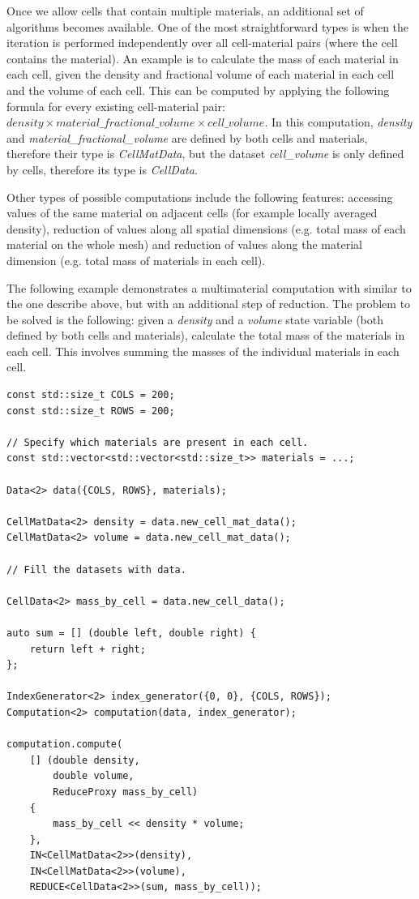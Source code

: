 \documentclass[fontsize=11pt, appendixprefix=true]{scrreprt}
\begin{document}
Once we allow cells that contain multiple materials, an additional set of
algorithms becomes available. One of the most straightforward types is when the
iteration is performed independently over all cell-material pairs (where the
cell contains the material). An example is to calculate the mass of each
material in each cell, given the density and fractional volume of each material
in each cell and the volume of each cell. This can be computed by applying the
following formula for every existing cell-material pair: $density \times
material\_fractional\_volume \times cell\_volume$. In this computation,
\textit{density} and \textit{material\_fractional\_volume} are defined by both
cells and materials, therefore their type is \textit{CellMatData}, but the
dataset \textit{cell\_volume} is only defined by cells, therefore its type is
\textit{CellData}.

Other types of possible computations include the following features: accessing
values of the same material on adjacent cells (for example locally averaged
density), reduction of values along all spatial dimensions (e.g. total mass of
each material on the whole mesh) and reduction of values along the material
dimension (e.g. total mass of materials in each cell).

The following example demonstrates a multimaterial computation with similar to
the one describe above, but with an additional step of reduction. The problem to
be solved is the following: given a \textit{density} and a \textit{volume} state
variable (both defined by both cells and materials), calculate the total mass of
the materials in each cell. This involves summing the masses of the individual
materials in each cell.

\begin{lstlisting}
const std::size_t COLS = 200;
const std::size_t ROWS = 200;

// Specify which materials are present in each cell.
const std::vector<std::vector<std::size_t>> materials = ...;

Data<2> data({COLS, ROWS}, materials);

CellMatData<2> density = data.new_cell_mat_data();
CellMatData<2> volume = data.new_cell_mat_data();

// Fill the datasets with data.

CellData<2> mass_by_cell = data.new_cell_data();

auto sum = [] (double left, double right) {
    return left + right;
};

IndexGenerator<2> index_generator({0, 0}, {COLS, ROWS});
Computation<2> computation(data, index_generator);

computation.compute(
    [] (double density,
        double volume,
        ReduceProxy mass_by_cell)
    {
        mass_by_cell << density * volume;
    },
    IN<CellMatData<2>>(density),
    IN<CellMatData<2>>(volume),
    REDUCE<CellData<2>>(sum, mass_by_cell));
\end{lstlisting}
\end{document}
